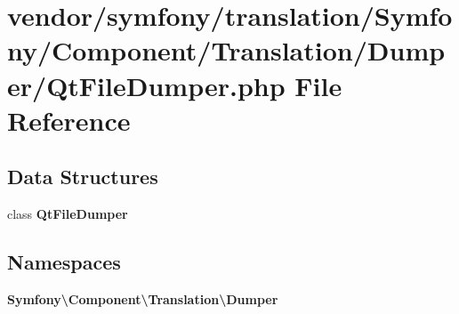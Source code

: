 \section{vendor/symfony/translation/\+Symfony/\+Component/\+Translation/\+Dumper/\+Qt\+File\+Dumper.php File Reference}
\label{_qt_file_dumper_8php}
\subsection*{Data Structures}
\begin{DoxyCompactItemize}
\item 
class {\bf Qt\+File\+Dumper}
\end{DoxyCompactItemize}
\subsection*{Namespaces}
\begin{DoxyCompactItemize}
\item 
 {\bf Symfony\textbackslash{}\+Component\textbackslash{}\+Translation\textbackslash{}\+Dumper}
\end{DoxyCompactItemize}
